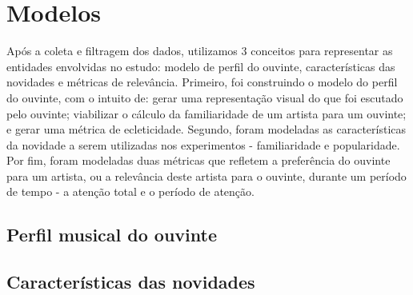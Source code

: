 	\chapter{Modelos} \label{cap:modelos}
	
	Após a coleta e filtragem dos dados, utilizamos 3 conceitos para representar as entidades envolvidas no estudo: modelo de perfil do ouvinte, características das novidades e métricas de relevância. Primeiro, foi construindo o modelo do perfil do ouvinte, com o intuito de: gerar uma representação visual do que foi escutado pelo ouvinte; viabilizar o cálculo da familiaridade de um artista para um ouvinte; e gerar uma métrica de ecleticidade. Segundo, foram modeladas as características da novidade a serem utilizadas nos experimentos - familiaridade e popularidade. Por fim, foram modeladas duas métricas que refletem a preferência do ouvinte para um artista, ou a relevância deste artista para o ouvinte, durante um período de tempo - a atenção total e o período de atenção.
 
	\section{Perfil musical do ouvinte}\label{sec:perfil}
 

	\section{Características das novidades}  
	
